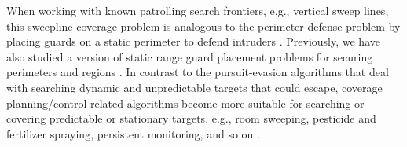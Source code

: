 When working with known patrolling search frontiers, e.g., vertical sweep lines, 
this sweepline coverage problem is analogous to the perimeter defense problem by placing guards on a static perimeter
to defend intruders \cite{shishika2020cooperative, macharet2020adaptive, chen2021optimal}.
Previously, we have also studied a version of static range guard placement problems for securing perimeters and regions \cite{fengyu2020optimally}.
In contrast to the pursuit-evasion algorithms that deal with searching dynamic and unpredictable targets that could escape, 
coverage planning/control-related algorithms become more suitable for searching or covering predictable or stationary targets,
e.g., room sweeping, pesticide and fertilizer spraying, persistent monitoring, and so on 
\cite{cortes2004coverage, oksanen2009coverage, haksar2020spatial, wei2018coverage, deng2019constrained, 
lan2013planning, cassandras2012optimal, yu2015persistent, palacios2017optimal}. 


